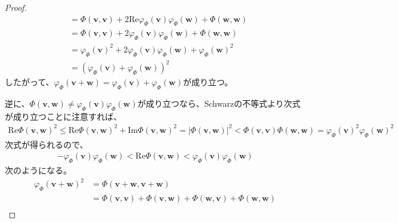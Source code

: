 \documentclass[dvipdfmx]{jsarticle}
\begin{document}
\begin{proof}
\begin{align*}
&= \varPhi\left( \mathbf{v},\mathbf{v} \right) + 2\mathrm{Re}{\varphi_{\varPhi}\left( \mathbf{v} \right)\varphi_{\varPhi}\left( \mathbf{w} \right)} + \varPhi\left( \mathbf{w},\mathbf{w} \right)\\
&= \varPhi\left( \mathbf{v},\mathbf{v} \right) + 2\varphi_{\varPhi}\left( \mathbf{v} \right)\varphi_{\varPhi}\left( \mathbf{w} \right) + \varPhi\left( \mathbf{w},\mathbf{w} \right)\\
&= {\varphi_{\varPhi}\left( \mathbf{v} \right)}^{2} + 2\varphi_{\varPhi}\left( \mathbf{v} \right)\varphi_{\varPhi}\left( \mathbf{w} \right) + {\varphi_{\varPhi}\left( \mathbf{w} \right)}^{2}\\
&= \left( \varphi_{\varPhi}\left( \mathbf{v} \right) + \varphi_{\varPhi}\left( \mathbf{w} \right) \right)^{2}
\end{align*}
したがって、$\varphi_{\varPhi}\left( \mathbf{v} + \mathbf{w} \right) = \varphi_{\varPhi}\left( \mathbf{v} \right) + \varphi_{\varPhi}\left( \mathbf{w} \right)$が成り立つ。\par
逆に、$\varPhi\left( \mathbf{v},\mathbf{w} \right) \neq \varphi_{\varPhi}\left( \mathbf{v} \right)\varphi_{\varPhi}\left( \mathbf{w} \right)$が成り立つなら、Schwarzの不等式より次式が成り立つことに注意すれば、
\begin{align*}
{\mathrm{Re}{\varPhi\left( \mathbf{v},\mathbf{w} \right)}}^{2} \leq {\mathrm{Re}{\varPhi\left( \mathbf{v},\mathbf{w} \right)}}^{2} + {\mathrm{Im}{\varPhi\left( \mathbf{v},\mathbf{w} \right)}}^{2} = \left| \varPhi\left( \mathbf{v},\mathbf{w} \right) \right|^{2} < \varPhi\left( \mathbf{v},\mathbf{v} \right)\varPhi\left( \mathbf{w},\mathbf{w} \right) = {\varphi_{\varPhi}\left( \mathbf{v} \right)}^{2}{\varphi_{\varPhi}\left( \mathbf{w} \right)}^{2}
\end{align*}
次式が得られるので、
\begin{align*}
- \varphi_{\varPhi}\left( \mathbf{v} \right)\varphi_{\varPhi}\left( \mathbf{w} \right) < \mathrm{Re}{\varPhi\left( \mathbf{v},\mathbf{w} \right)} < \varphi_{\varPhi}\left( \mathbf{v} \right)\varphi_{\varPhi}\left( \mathbf{w} \right)
\end{align*}
次のようになる。
\begin{align*}
{\varphi_{\varPhi}\left( \mathbf{v} + \mathbf{w} \right)}^{2} &= \varPhi\left( \mathbf{v} + \mathbf{w},\mathbf{v} + \mathbf{w} \right)\\
&= \varPhi\left( \mathbf{v},\mathbf{v} \right) + \varPhi\left( \mathbf{v},\mathbf{w} \right) + \varPhi\left( \mathbf{w},\mathbf{v} \right) + \varPhi\left( \mathbf{w},\mathbf{w} \right)\\

\end{align*}
\end{proof}
\end{document}
